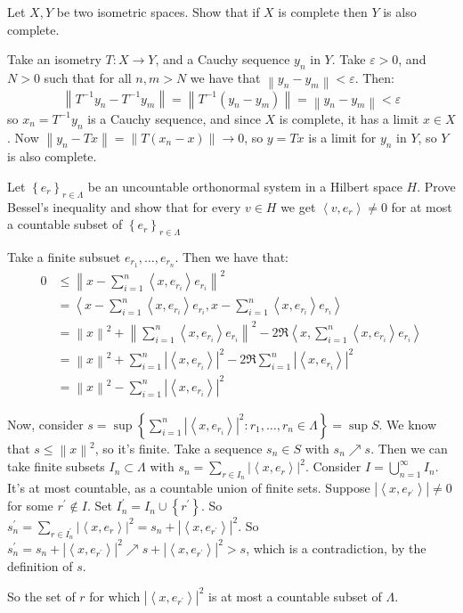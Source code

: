 \documentclass[11pt]{article} %
\newcommand{\norm}[1]{\left\lVert#1\right\rVert}
\newcommand{\abs}[1]{\left|#1\right|}
\newcommand{\inpr}[2]{\left<#1, #2\right>}
\begin{document}
\begin{Exercise}
Let $X,Y$ be two isometric spaces. Show that if $X$ is complete then $Y$ is also complete.
\end{Exercise}

\begin{Answer} 
Take an isometry $T:X\to Y$, and a Cauchy sequence $y_n$ in $Y$. Take $\varepsilon > 0$, and $N > 0$ such that for all $n,m > N$ we have that $\norm{y_n - y_m} < \varepsilon$. Then: 
\[  \norm{T^{-1}y_n - T^{-1} y_m} = \norm{T^{-1}\left(y_n - y_m\right)} = \norm{y_n -y_m} < \varepsilon \]
so $x_n = T^{-1}y_n$ is a Cauchy sequence, and since $X$ is complete, it has a limit $x \in X$. Now $\norm{y_n - Tx} = \norm{T\left(x_n - x\right)} \to 0$, so $y = Tx$ is a limit for $y_n$ in $Y$, so $Y$ is also complete. 
\end{Answer}

\begin{Exercise*}
Let $\left\{e_r\right\}_{r\in\Lambda}$ be an uncountable orthonormal system in a Hilbert space $H$. Prove Bessel's inequality and show that for every $v\in H$ we get $\inpr{v}{e_r} \neq 0$ for at most a countable subset of $\left\{e_r\right\}_{r\in\Lambda}$
\end{Exercise*}

\begin{Answer}
Take a finite subsuet $e_{r_1}, \dots, e_{r_n}$. Then we have that:
\begin{equation}
\begin{split}
0 & \leq \norm{x - \sum_{i=1}^{n}\inpr{x}{e_{r_i}}e_{r_i}}^2 \\
& = \inpr{x - \sum_{i=1}^{n}\inpr{x}{e_{r_i}}e_{r_i}}{x - \sum_{i=1}^{n}\inpr{x}{e_{r_i}}e_{r_i}} \\
& = \norm{x}^2 + \norm{\sum_{i=1}^{n}\inpr{x}{e_{r_i}}e_{r_i}}^2 -2\Re\inpr{x}{\sum_{i=1}^{n}\inpr{x}{e_{r_i}}e_{r_i}} \\
& = \norm{x}^2 + \sum_{i=1}^n\abs{\inpr{x}{e_{r_i}}}^2 -2\Re\sum_{i=1}^{n}\abs{\inpr{x}{e_{r_i}}}^2 \\
& = \norm{x}^2 - \sum_{i=1}^{n}\abs{\inpr{x}{e_{r_i}}}^2
\end{split}
\end{equation}

Now, consider $s = \sup \left\{\sum_{i=1}^{n}\abs{\inpr{x}{e_{r_i}}}^2:r_1,\dots,r_n \in \Lambda\right\} = \sup S$. We know that $s \leq \norm{x}^2$, so it's finite. Take a sequence $s_n \in S$ with $s_n \nearrow s$. Then we can take finite subsets $I_n \subset \Lambda$ with $s_n = \sum_{r\in I_n}\abs{\inpr{x}{e_r}}^2$. Consider $I = \bigcup_{n=1}^{\infty} I_n$. It's at most countable, as a countable union of finite sets. Suppose $\abs{\inpr{x}{e_{r^\prime}}} \neq 0$ for some $r^\prime \notin I$. Set $I_n^\prime = I_n \cup \left\{r^\prime\right\}$. So $s_n^\prime = \sum_{r\in I_n^\prime}\abs{\inpr{x}{e_r}}^2 = s_n + \abs{\inpr{x}{e_{r^\prime}}}^2$. So $s_n^\prime = s_n + \abs{\inpr{x}{e_{r^\prime}}}^2 \nearrow s + \abs{\inpr{x}{e_{r^\prime}}}^2 > s$, which is a contradiction, by the definition of $s$.

So the set of $r$ for which $\abs{\inpr{x}{e_{r^\prime}}}^2$ is at most a countable subset of $\Lambda$.
\end{Answer}
\end{document}
